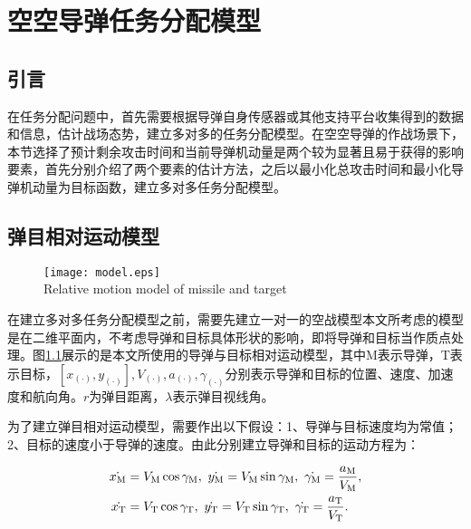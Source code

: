 
\chapter{空空导弹任务分配模型}
\label{chap:model}

\section{引言}
\label{model:sec:intro}

在任务分配问题中，首先需要根据导弹自身传感器或其他支持平台收集得到的数据和信息，估计战场态势，建立多对多的任务分配模型。在空空导弹的作战场景下，本节选择了预计剩余攻击时间和当前导弹机动量是两个较为显著且易于获得的影响要素，首先分别介绍了两个要素的估计方法，之后以最小化总攻击时间和最小化导弹机动量为目标函数，建立多对多任务分配模型。


\section{弹目相对运动模型}
\label{model:sec:move}

\begin{figure}[htp]
  \centering
  \texttt{[image: model.eps]} \\
    {Relative motion model of missile and target}
 \label{fig:model}
\end{figure}

在建立多对多任务分配模型之前，需要先建立一对一的空战模型本文所考虑的模型是在二维平面内，不考虑导弹和目标具体形状的影响，即将导弹和目标当作质点处理。图\ref{fig:model}展示的是本文所使用的导弹与目标相对运动模型，其中M表示导弹，T表示目标，$[x_{(\cdot)},y_{(\cdot)}],V_{(\cdot)},a_{(\cdot)},\gamma_{(\cdot)}$分别表示导弹和目标的位置、速度、加速度和航向角。$r$为弹目距离，$\lambda$表示弹目视线角。

为了建立弹目相对运动模型，需要作出以下假设：1、导弹与目标速度均为常值；2、目标的速度小于导弹的速度。由此分别建立导弹和目标的运动方程为：

\begin{align}
	\label{model:eq:Mmotion} \dot{x_{\text M}}&=V_{\text M} \cos{\gamma_{\text M}},\ \dot{y_{\text M}}=V_{\text M} \sin{\gamma_{\text M}},\ \dot{\gamma_{\text M}}=\dfrac{a_{\text M}}{V_{\text M}},\\
	\label{model:eq:Tmotion} \dot{x_{\text T}}&=V_{\text T} \cos{\gamma_{\text T}},\ \dot{y_{\text T}}=V_{\text T} \sin{\gamma_{\text T}},\ \dot{\gamma_{\text T}}=\dfrac{a_{\text T}}{V_{\text T}}.
\end{align}

